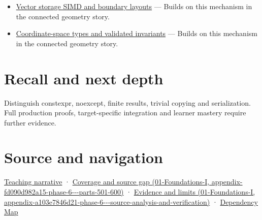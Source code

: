 \begin{itemize}
\tightlist
\item
  \hyperref[appendix-26bf6bf2fb8b]{Vector storage SIMD and boundary layouts} --- Builds on this mechanism in the connected geometry story.
\item
  \hyperref[appendix-380a220e2529]{Coordinate-space types and validated invariants} --- Builds on this mechanism in the connected geometry story.
\end{itemize}

\section{Recall and next depth}\label{appendix-37a39984ba66-recall-and-next-depth}

Distinguish constexpr, noexcept, finite results, trivial copying and serialization. Full production proofs, target-specific integration and learner mastery require further evidence.

\section{Source and navigation}\label{appendix-37a39984ba66-source-and-navigation}

\href{Continuous\%20Notes/Computing\%20Foundations\%20-\%20From\%20Bits\%20to\%20C++\%20and\%20Systems\%20APIs\#Three\%20stored\%20numbers\%20are\%20not\%20the\%20complete\%20contract}{Teaching narrative} · \href{../01-Foundations-I/main.pdf\#nameddest=appendix-fd090d982a15-phase-6---parts-501-600}{Coverage and source gap (01-Foundations-I, appendix-fd090d982a15-phase-6-\/-\/-parts-501-600)} · \href{../01-Foundations-I/main.pdf\#nameddest=appendix-a103e7846d21-phase-6---source-analysis-and-verification}{Evidence and limits (01-Foundations-I, appendix-a103e7846d21-phase-6-\/-\/-source-analysis-and-verification)} · \hyperref[appendix-4ad47bdd269a]{Dependency Map}

